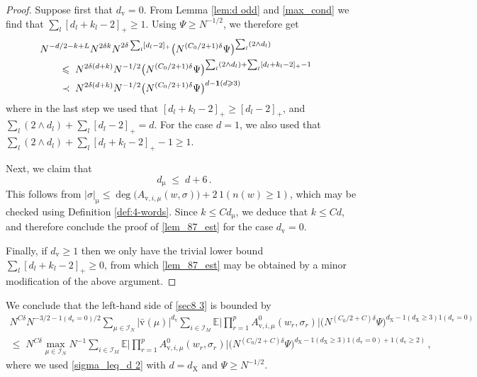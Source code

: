 \documentclass[11pt]{article} %
\numberwithin{equation}{section}
\numberwithin{figure}{section}
\theoremstyle{plain} %
\theoremstyle{definition} %
\newcommand{\f}[1]{\boldsymbol{\mathrm{#1}}} %
\renewcommand{\cal}{\mathcal}
\newcommand{\E}{\mathbb{E}}
\renewcommand{\leq}{\leqslant}
\renewcommand{\geq}{\geqslant}
\newcommand{\ind}[1]{\f 1 (#1)}
\newcommand{\pb}[1]{\bigl({#1}\bigr)}
\newcommand{\abs}[1]{\lvert #1 \rvert}
\newcommand{\absBB}[1]{\Biggl\lvert #1 \Biggr\rvert}
\begin{document}
\begin{proof}
Suppose first that $d_{\f v} = 0$.
From Lemma \ref{lem:d odd} and \eqref{max_cond} we find that $\sum_l [d_l + k_l - 2]_+ \geq 1$. Using $\Psi \geq N^{-1/2}$, we therefore get
\begin{align*}
&\mspace{-30mu} N^{-d/2 - k + L} N^{2 \delta k} N^{2 \delta \sum_l [d_l - 2]_+} \pb{N^{(C_0/2 + 1) \delta} \Psi}^{\sum_l (2 \wedge d_l)}
\\
&\;\leq\;
N^{2 \delta (d+k)} N^{-1/2} \pb{N^{(C_0/2 + 1) \delta} \Psi}^{\sum_l (2 \wedge d_l) + \sum_l [d_l + k_l - 2]_+ - 1}
\\
&\;\prec\;
N^{2 \delta (d+k)} N^{-1/2} \pb{N^{(C_0/2 + 1) \delta} \Psi}^{d - \ind{d \geq 3}}
\end{align*}
where in the last step we used that $[d_l + k_l  - 2]_+ \geq [d_l - 2]_+$, and $\sum_l (2 \wedge d_l) + \sum_l [d_l - 2]_+ = d$. For the case $d = 1$, we also used that $\sum_l (2 \wedge d_l) + \sum_l [d_l + k_l - 2]_+ - 1 \geq 1$.

Next, we claim that
\begin{equation} \label{sigma_leq_d 2}
d_{\f \mu} \;\leq\; d + 6\,.
\end{equation}
This follows from $\abs{\sigma}_{\f \mu} \leq \deg \pb{A_{\f v,i,\mu}(w,\sigma)} + 2 \, \ind{n(w) \geq 1}$, which may be checked using Definition \ref{def:4-words}.
Since $k \leq C d_{\f \mu}$, we deduce that $k \leq C d$, and therefore conclude the proof of \eqref{lem_87_est} for the case $d_{\f v} = 0$.



Finally, if $d_{\f v} \geq 1$ then we only have the trivial lower bound $\sum_l [d_l + k_l  - 2]_+ \geq 0$, from which \eqref{lem_87_est} may be obtained by a minor modification of the above argument.
\end{proof}

We conclude that the left-hand side of \eqref{sec8 3} is bounded by
\begin{multline} \label{sec8 4}
N^{C \delta} N^{-3/2 -\ind{d_{\f v} = 0}/2} \sum_{\mu \in \cal I_N} \abs{\bar{\f v}(\mu)}^{d_{\f v}} \sum_{i \in \cal I_M}  \E \absBB{\prod_{r = 1}^{p} A_{\f v,i,\mu}^0(w_r, \sigma_r)} \pb{N^{(C_0/2 + C) \delta} \Psi}^{d_{\f X} - \ind{d_{\f X} \geq 3} \ind{d_{\f v} = 0}}
\\
\leq\;
N^{C \delta} \max_{\mu \in \cal I_N} N^{-1} \sum_{i \in \cal I_M} \E \absBB{\prod_{r = 1}^{p} A_{\f v,i,\mu}^0(w_r, \sigma_r)} \pb{N^{(C_0/2 + C) \delta} \Psi}^{d_{\f X} - \ind{d_{\f X} \geq 3} \ind{d_{\f v} = 0} + \ind{d_{\f v} \geq 2}}\,,
\end{multline}
where we used \eqref{sigma_leq_d 2} with $d = d_{\f X}$ and $\Psi \geq N^{-1/2}$.
\end{document}
